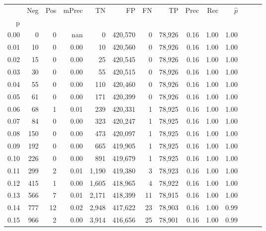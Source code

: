 \begin{tabular}{rrrrrrrrrrrrrr}
\toprule
{} &     Neg &    Pos & mPrec &       TN &       FP &      FN &      TP &  Prec &   Rec & $\hat{p}$ \\
p    &         &        &       &          &          &         &         &       &       &           \\
\midrule
0.00 &       0 &      0 &   nan &        0 &  420,570 &       0 &  78,926 &  0.16 &  1.00 &      1.00 \\
0.01 &      10 &      0 &  0.00 &       10 &  420,560 &       0 &  78,926 &  0.16 &  1.00 &      1.00 \\
0.02 &      15 &      0 &  0.00 &       25 &  420,545 &       0 &  78,926 &  0.16 &  1.00 &      1.00 \\
0.03 &      30 &      0 &  0.00 &       55 &  420,515 &       0 &  78,926 &  0.16 &  1.00 &      1.00 \\
0.04 &      55 &      0 &  0.00 &      110 &  420,460 &       0 &  78,926 &  0.16 &  1.00 &      1.00 \\
0.05 &      61 &      0 &  0.00 &      171 &  420,399 &       0 &  78,926 &  0.16 &  1.00 &      1.00 \\
0.06 &      68 &      1 &  0.01 &      239 &  420,331 &       1 &  78,925 &  0.16 &  1.00 &      1.00 \\
0.07 &      84 &      0 &  0.00 &      323 &  420,247 &       1 &  78,925 &  0.16 &  1.00 &      1.00 \\
0.08 &     150 &      0 &  0.00 &      473 &  420,097 &       1 &  78,925 &  0.16 &  1.00 &      1.00 \\
0.09 &     192 &      0 &  0.00 &      665 &  419,905 &       1 &  78,925 &  0.16 &  1.00 &      1.00 \\
0.10 &     226 &      0 &  0.00 &      891 &  419,679 &       1 &  78,925 &  0.16 &  1.00 &      1.00 \\
0.11 &     299 &      2 &  0.01 &    1,190 &  419,380 &       3 &  78,923 &  0.16 &  1.00 &      1.00 \\
0.12 &     415 &      1 &  0.00 &    1,605 &  418,965 &       4 &  78,922 &  0.16 &  1.00 &      1.00 \\
0.13 &     566 &      7 &  0.01 &    2,171 &  418,399 &      11 &  78,915 &  0.16 &  1.00 &      1.00 \\
0.14 &     777 &     12 &  0.02 &    2,948 &  417,622 &      23 &  78,903 &  0.16 &  1.00 &      0.99 \\
0.15 &     966 &      2 &  0.00 &    3,914 &  416,656 &      25 &  78,901 &  0.16 &  1.00 &      0.99 \\

\end{tabular}
